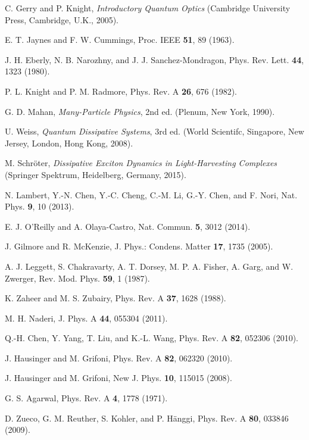 \documentclass[%
reprint,
amsmath,amssymb,
aps,
pra,
]{revtex4-1}
\begin{document}
\begin{thebibliography}{99}
 C. Gerry and P. Knight, \textit{Introductory Quantum Optics} (Cambridge University Press, Cambridge, U.K., 2005).

 E. T. Jaynes and F. W. Cummings, Proc. IEEE \textbf{51}, 89 (1963).

 J. H. Eberly, N. B. Narozhny, and J. J. Sanchez-Mondragon, Phys. Rev. Lett. \textbf{44}, 1323 (1980).

 P. L. Knight and P. M. Radmore, Phys. Rev. A \textbf{26}, 676 (1982).

 G. D. Mahan, \textit{Many-Particle Physics}, 2nd ed. (Plenum, New York, 1990). 

 U. Weiss, \textit{Quantum Dissipative Systems}, 3rd ed. (World Scientifc, Singapore, New Jersey, London, Hong Kong, 2008).

 M. Schr\"oter, \textit{Dissipative Exciton Dynamics in Light-Harvesting Complexes} (Springer Spektrum, Heidelberg,
Germany, 2015).

 N. Lambert, Y.-N. Chen, Y.-C. Cheng, C.-M. Li, G.-Y. Chen, and F. Nori, Nat. Phys. \textbf{9}, 10 (2013).

 E. J. O'Reilly and A. Olaya-Castro, Nat. Commun. \textbf{5}, 3012 (2014).

 J. Gilmore and R. McKenzie, J. Phys.: Condens. Matter \textbf{17}, 1735 (2005).

 A. J. Leggett, S. Chakravarty, A. T. Dorsey, M. P. A. Fisher, A. Garg, and W. Zwerger, Rev. Mod. Phys. \textbf{59}, 1 (1987).

 K. Zaheer and M. S. Zubairy, Phys. Rev. A \textbf{37}, 1628 (1988).

 M. H. Naderi, J. Phys. A \textbf{44}, 055304 (2011).

 Q.-H. Chen, Y. Yang, T. Liu, and K.-L. Wang, Phys. Rev. A \textbf{82}, 052306 (2010).

 J. Hausinger and M. Grifoni, Phys. Rev. A \textbf{82}, 062320 (2010).

 J. Hausinger and M. Grifoni, New J. Phys. \textbf{10}, 115015 (2008).

 G. S. Agarwal, Phys. Rev. A \textbf{4}, 1778 (1971).

 D. Zueco, G. M. Reuther, S. Kohler, and P. H\"anggi, Phys. Rev. A \textbf{80}, 033846 (2009).


\end{thebibliography}
\end{document}

